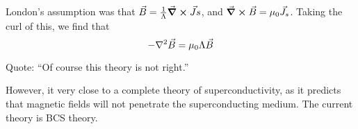 \documentclass[a4paper,twoside,master.tex]{subfiles}
\begin{document}
London's assumption was that $ \vec{B} = \frac{1}{\Lambda} \curl{ \vec{J} s} $, and $ \curl{ \vec{B}} = \mu_0 \vec{J}_s $. Taking the curl of this, we find that
\begin{equation}
    - \laplacian{ \vec{B}} = \mu_0 \Lambda \vec{B}
\end{equation}

\begin{note}{Quote:}
    ``Of course this theory is not right.''
\end{note}

However, it very close to a complete theory of superconductivity, as it predicts that magnetic fields will not penetrate the superconducting medium. The current theory is BCS theory.
\end{document}
